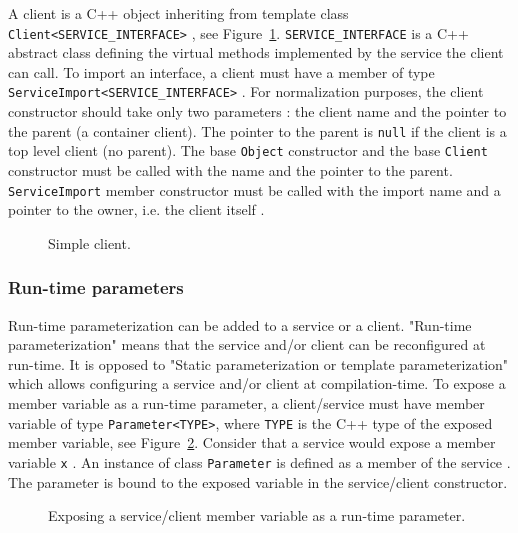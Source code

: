A client is a C++ object inheriting from template class \texttt{Client<SERVICE\_INTERFACE>} , see Figure~\ref{fig:tms320c3x_simple_client}.
\texttt{SERVICE\_INTERFACE} is a C++ abstract class defining the virtual methods implemented by the service the client can call.
To import an interface, a client must have a member of type \texttt{ServiceImport<SERVICE\_INTERFACE>} .
For normalization purposes, the client constructor should take only two parameters : the client name and the pointer to the parent (a container client).
The pointer to the parent is \texttt{null} if the client is a top level client (no parent).
The base \texttt{Object} constructor  and the base \texttt{Client} constructor  must be called with the name and the pointer to the parent.
\texttt{ServiceImport} member constructor must be called with the import name and a pointer to the owner, i.e. the client itself .


\begin{figure}[h]
  \begin{center}
    
    \caption{\label{fig:tms320c3x_simple_client} Simple client.}
  \end{center}
\end{figure}

\subsubsection{Run-time parameters}

Run-time parameterization can be added to a service or a client. "Run-time parameterization" means that the service and/or client can be reconfigured at run-time. It is opposed to "Static parameterization or template parameterization" which allows configuring a service and/or client at compilation-time.
To expose a member variable as a run-time parameter, a client/service must have member variable of type \texttt{Parameter<TYPE>}, where \texttt{TYPE} is the C++ type of the exposed member variable, see Figure~\ref{fig:tms320c3x_run_time_parameter}. Consider that a service would expose a member variable \texttt{x} . An instance of class \texttt{Parameter} is defined as a member of the service . 
The parameter is bound to the exposed variable  in the service/client constructor.

\begin{figure}[h]
  \begin{center}
    
    \caption{\label{fig:tms320c3x_run_time_parameter} Exposing a service/client member variable as a run-time parameter.}
  \end{center}
\end{figure}

